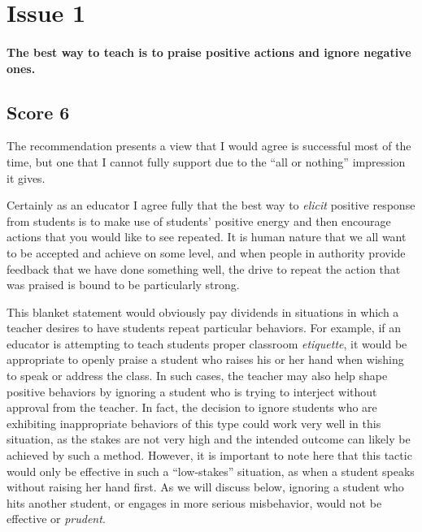 \section{Issue 1}
\paragraph{The best way to teach is to praise positive actions and ignore negative ones.}

\subsection{Score 6}
The recommendation presents a view that I would agree is successful most of the time, but one that I cannot fully support due to the ``all or nothing'' impression it gives.

Certainly as an educator I agree fully that the best way to \emph{elicit} positive response from students is to make use of students' positive energy and then encourage actions that you would like to see repeated.
It is human nature that we all want to be accepted and achieve on some level, and when people in authority provide feedback that we have done something well, the drive to repeat the action that was praised is bound to be particularly strong.

This blanket statement would obviously pay dividends in situations in which a teacher desires to have students repeat particular behaviors.
For example, if an educator is attempting to teach students proper classroom \emph{etiquette}, it would be appropriate to openly praise a student who raises his or her hand when wishing to speak or address the class.
In such cases, the teacher may also help shape positive behaviors by ignoring a student who is trying to interject without approval from the teacher.
In fact, the decision to ignore students who are exhibiting inappropriate behaviors of this type could work very well in this situation, as the stakes are not very high and the intended outcome can likely be achieved by such a method.
However, it is important to note here that this tactic would only be effective in such a ``low-stakes'' situation, as when a student speaks without raising her hand first.
As we will discuss below, ignoring a student who hits another student, or engages in more serious misbehavior, would not be effective or \emph{prudent}.

